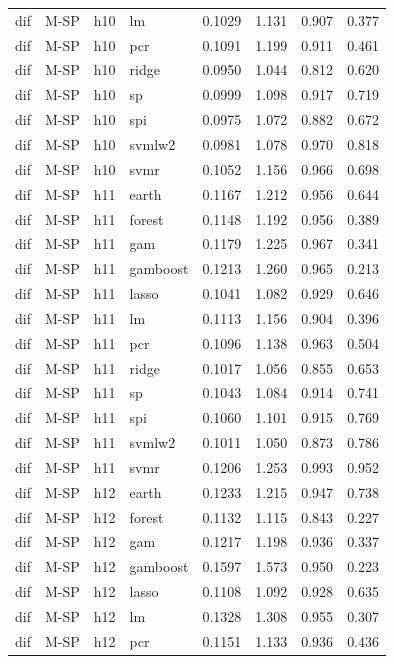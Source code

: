 \begin{ThreePartTable}
\begin{longtable}[t]{llclcccc}
dif & M-SP & h10 & lm & 0.1029 & 1.131 & 0.907 & 0.377\\
dif & M-SP & h10 & pcr & 0.1091 & 1.199 & 0.911 & 0.461\\
dif & M-SP & h10 & ridge & 0.0950 & 1.044 & 0.812 & 0.620\\
dif & M-SP & h10 & sp & 0.0999 & 1.098 & 0.917 & 0.719\\
dif & M-SP & h10 & spi & 0.0975 & 1.072 & 0.882 & 0.672\\
dif & M-SP & h10 & svmlw2 & 0.0981 & 1.078 & 0.970 & 0.818\\
dif & M-SP & h10 & svmr & 0.1052 & 1.156 & 0.966 & 0.698\\
\addlinespace
dif & M-SP & h11 & earth & 0.1167 & 1.212 & 0.956 & 0.644\\
dif & M-SP & h11 & forest & 0.1148 & 1.192 & 0.956 & 0.389\\
dif & M-SP & h11 & gam & 0.1179 & 1.225 & 0.967 & 0.341\\
dif & M-SP & h11 & gamboost & 0.1213 & 1.260 & 0.965 & 0.213\\
dif & M-SP & h11 & lasso & 0.1041 & 1.082 & 0.929 & 0.646\\
dif & M-SP & h11 & lm & 0.1113 & 1.156 & 0.904 & 0.396\\
dif & M-SP & h11 & pcr & 0.1096 & 1.138 & 0.963 & 0.504\\
dif & M-SP & h11 & ridge & 0.1017 & 1.056 & 0.855 & 0.653\\
dif & M-SP & h11 & sp & 0.1043 & 1.084 & 0.914 & 0.741\\
dif & M-SP & h11 & spi & 0.1060 & 1.101 & 0.915 & 0.769\\
dif & M-SP & h11 & svmlw2 & 0.1011 & 1.050 & 0.873 & 0.786\\
dif & M-SP & h11 & svmr & 0.1206 & 1.253 & 0.993 & 0.952\\
\addlinespace
dif & M-SP & h12 & earth & 0.1233 & 1.215 & 0.947 & 0.738\\
dif & M-SP & h12 & forest & 0.1132 & 1.115 & 0.843 & 0.227\\
dif & M-SP & h12 & gam & 0.1217 & 1.198 & 0.936 & 0.337\\
dif & M-SP & h12 & gamboost & 0.1597 & 1.573 & 0.950 & 0.223\\
dif & M-SP & h12 & lasso & 0.1108 & 1.092 & 0.928 & 0.635\\
dif & M-SP & h12 & lm & 0.1328 & 1.308 & 0.955 & 0.307\\
dif & M-SP & h12 & pcr & 0.1151 & 1.133 & 0.936 & 0.436\\

\end{longtable}
\end{ThreePartTable}
